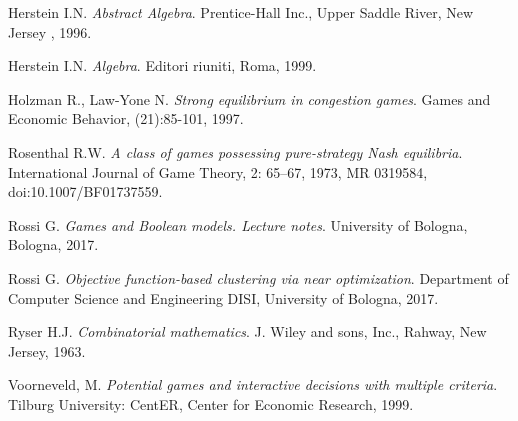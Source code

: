 \documentclass{article}
\begin{document}
\begin{thebibliography}{9}
Herstein I.N.
\textit{Abstract Algebra}. 
Prentice-Hall Inc., Upper Saddle River, New Jersey , 1996.

Herstein I.N.
\textit{Algebra}. 
Editori riuniti, Roma, 1999.

Holzman R., Law-Yone N.
\textit{Strong equilibrium in congestion games}.
Games and Economic Behavior, (21):85-101, 1997.

Rosenthal R.W.
\textit{A class of games possessing pure-strategy Nash equilibria}.
International Journal of Game Theory, 2: 65–67, 1973, MR 0319584, doi:10.1007/BF01737559.

Rossi G.
\textit{Games and Boolean models. Lecture notes}.
University of Bologna, Bologna, 2017.

Rossi G.
\textit{Objective function-based clustering via near optimization}.
Department of Computer Science and Engineering DISI, University of Bologna, 2017.

Ryser H.J.
\textit{Combinatorial mathematics}.
J. Wiley and sons, Inc., Rahway, New Jersey, 1963.


Voorneveld, M. 
\textit{Potential games and interactive decisions with multiple criteria}.
Tilburg University: CentER, Center for Economic Research, 1999.

 

\end{thebibliography}
\end{document}
